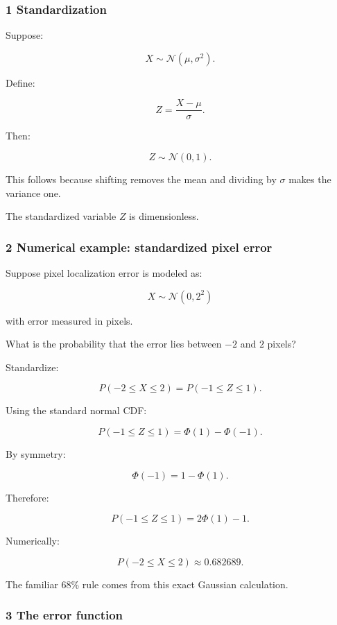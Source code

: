 \subsubsection{1 Standardization}\label{02-foundations-ii-ch023-standardization}

Suppose:

\[
 X\sim\mathcal N(\mu,\sigma^2).
\]

Define:

\[
 \boxed{ Z=\frac{X-\mu}{\sigma} }.
\]

Then:

\[
 Z\sim\mathcal N(0,1).
\]

This follows because shifting removes the mean and dividing by \(\sigma\) makes the variance one.

The standardized variable \(Z\) is dimensionless.

\subsubsection{2 Numerical example: standardized pixel error}\label{02-foundations-ii-ch023-numerical-example-standardized-pixel-error}

Suppose pixel localization error is modeled as:

\[
 X\sim\mathcal N(0,2^2)
\]

with error measured in pixels.

What is the probability that the error lies between \(-2\) and \(2\) pixels?

Standardize:

\[
 P(-2\le X\le2) = P\left(-1\le Z\le1\right).
\]

Using the standard normal CDF:

\[
 P(-1\le Z\le1) = \Phi(1)-\Phi(-1).
\]

By symmetry:

\[
 \Phi(-1)=1-\Phi(1).
\]

Therefore:

\[
 P(-1\le Z\le1) = 2\Phi(1)-1.
\]

Numerically:

\[
 \boxed{P(-2\le X\le2)\approx0.682689}.
\]

The familiar 68\% rule comes from this exact Gaussian calculation.

\subsubsection{3 The error function}\label{02-foundations-ii-ch023-the-error-function}

